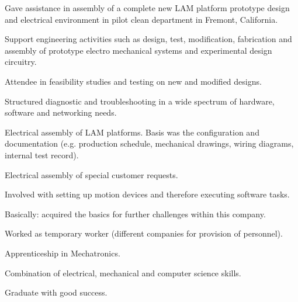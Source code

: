 \documentclass[]{resume}
\begin{document}
\begin{minipage}[t]{0.66\textwidth}
\begin{tightemize}
		\item Gave assistance in assembly of a complete new LAM platform prototype design and electrical environment in pilot clean department in Fremont, California.
		\item Support engineering activities such as design, test, modification, fabrication and assembly of prototype electro mechanical systems and experimental design circuitry. 	
		\item Attendee in feasibility studies and testing on new and modified designs.
		\item Structured diagnostic and troubleshooting in a wide spectrum of hardware, software and networking needs. 
		
	\end{tightemize}
	\sectionsep

	\begin{tightemize}
		
		\item Electrical assembly of LAM platforms. Basis was the configuration and documentation (e.g. production schedule, mechanical drawings, wiring diagrams, internal test record).
		\item Electrical assembly of special customer requests.
		\item Involved with setting up motion devices and therefore executing software tasks.
		
	\end{tightemize}
	\sectionsep
	\begin{tightemize}
		
	\item Basically: acquired the basics for further challenges within this company. 
	\item Worked as temporary worker (different companies for provision of personnel).
	
	\end{tightemize}
	\sectionsep
	\begin{tightemize}

		\item Apprenticeship in Mechatronics.
		\item Combination of electrical, mechanical and computer science skills.
		\item Graduate with good success.
		
	\end{tightemize}
	\sectionsep
\end{minipage} 
\vfill \vfill \vfill \vfill
\pagebreak
\end{document}
